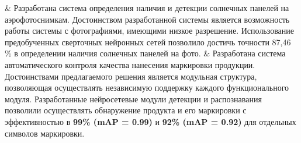 \begin{easylistNum}
    & Разработана система определения наличия и детекции солнечных панелей на аэрофотоснимкам. Достоинством разработанной системы является возможность работы системы с фотографиями, имеющими низкое разрешение. Использование предобученных сверточных нейронных сетей позволило достичь точности 87,46 \% в определении наличия солнечных панелей на фото.
	& Разработана система автоматического контроля качества нанесения маркировки продукции. Достоинствами предлагаемого решения является модульная структура, позволяющая осуществлять независимую поддержку каждого функционального модуля. Разработанные нейросетевые модули детекции и распознавания позволили осуществлять обнаружение продукта и его маркировки с эффективностью в \textbf{99\% (mAP = 0.99)} и \textbf{92\% (mAP = 0.92)} для отдельных символов маркировки.
\end{easylistNum}







